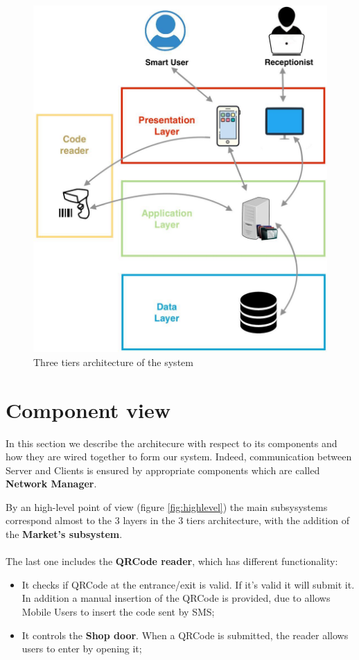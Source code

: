 \begin{figure}[H]
  \label{3tiers}
  \centering
  \includegraphics[scale=0.30]{diagrams/3_tiers.jpeg}
  \caption{Three tiers architecture of the system}
  \label{3-tier}

\end{figure}

\pagebreak
\section{Component view}



In this section we describe the architecure with respect to its components and how they are wired together to form our system. 
Indeed, communication between Server and Clients is ensured by appropriate components which are called \textbf{Network Manager}. \par 
By an high-level point of view (figure \ref{fig:highlevel}) the main subsysystems correspond almost to the 3 layers in the 3 tiers architecture, with the addition of the \textbf{Market's subsystem}. \\ \\
The last one includes the \textbf{QRCode reader}, which has different functionality:
\begin{itemize}
\item It checks if QRCode at the entrance/exit is valid. If it's valid it will submit it. In addition a manual insertion of the QRCode is provided, due to allows Mobile Users to insert the code sent by SMS;
\item It controls the \textbf{Shop door}. When a QRCode is submitted, the reader allows users to enter by opening it;
\end{itemize}


